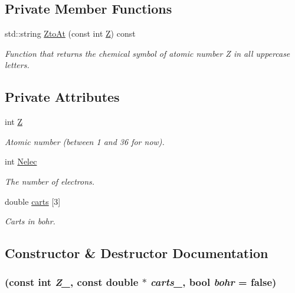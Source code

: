 \subsection*{Private Member Functions}
\begin{DoxyCompactItemize}
\item 
std::string \hyperlink{classJKBuilder_1_1atom_a163d1d4c84461da513e1d1346cb1b407}{ZtoAt} (const int \hyperlink{classJKBuilder_1_1atom_a5ed5bfe6933ed8cba853237650cc041b}{Z}) const 
\begin{DoxyCompactList}\small\item\em Function that returns the chemical symbol of atomic number Z in all uppercase letters. \item\end{DoxyCompactList}\end{DoxyCompactItemize}
\subsection*{Private Attributes}
\begin{DoxyCompactItemize}
\item 
int \hyperlink{classJKBuilder_1_1atom_a5ed5bfe6933ed8cba853237650cc041b}{Z}
\begin{DoxyCompactList}\small\item\em Atomic number (between 1 and 36 for now). \item\end{DoxyCompactList}\item 
int \hyperlink{classJKBuilder_1_1atom_a849e4a1d5fee0c024e42b658d3babd02}{Nelec}
\begin{DoxyCompactList}\small\item\em The number of electrons. \item\end{DoxyCompactList}\item 
double \hyperlink{classJKBuilder_1_1atom_a6b5adb6f3635311b52c7a7a35dcb01b4}{carts} \mbox{[}3\mbox{]}
\begin{DoxyCompactList}\small\item\em Carts in bohr. \item\end{DoxyCompactList}\end{DoxyCompactItemize}


\subsection{Constructor \& Destructor Documentation}
\hypertarget{classJKBuilder_1_1atom_a093b616ad3671037f440a6fa34ab6355}{
\subsubsection[{atom}]{ (const int {\em Z\_\-}, \/  const double $\ast$ {\em carts\_\-}, \/  bool {\em bohr} = {\ttfamily false})}}
\label{classJKBuilder_1_1atom_a093b616ad3671037f440a6fa34ab6355}


